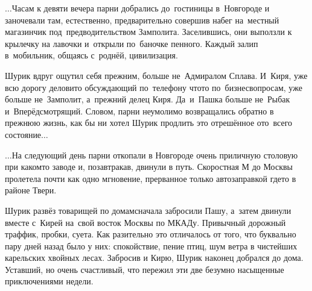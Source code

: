 $\ldots$Часам к девяти вечера парни добрались до~гостиницы в~Новгороде и заночевали там, естественно, предварительно совершив набег на~местный магазинчик под~предводительством Замполита. Заселившись, они выползли к крылечку на лавочки и~открыли по~баночке пенного. Каждый залип в~мобильник, общаясь с~роднёй, цивилизация. 

Шурик вдруг ощутил себя прежним, больше не~Адмиралом Сплава. И~Киря, уже всю дорогу деловито обсуждающий по~телефону что\sdash то по~бизнес\sdash вопросам, уже больше не~Замполит, а~прежний делец Киря. Да~и~Пашка больше не~Рыбак и~Вперёдсмотрящий. Словом, парни неумолимо возвращались обратно в прежнюю жизнь, как бы ни хотел Шурик продлить это отрешённое ото~всего состояние$\ldots$

$\ldots$На следующий день парни откопали в Новгороде очень приличную столовую при каком\sdash то заводе и, позавтракав, двинули в путь. Скоростная М до Москвы пролетела почти как одно мгновение, прерванное только автозаправкой где\sdash то в районе Твери.

Шурик развёз товарищей по домам\mdash сначала забросили Пашу, а~затем двинули вместе с~Кирей на~свой восток Москвы по МКАДу. Привычный дорожный траффик, пробки, суета. Как разительно это отличалось от того, что буквально пару дней назад было у них: спокойствие, пение птиц, шум ветра в чистейших карельских хвойных лесах. Забросив и Кирю, Шурик наконец добрался до дома. Уставший, но очень счастливый, что пережил эти две безумно насыщенные приключениями недели.





%
%
%
%
%



\begin{center}
\end{center}
